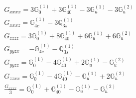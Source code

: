 \documentclass[fleqn,8pt,landscape]{jsarticle}
\begin{document}
\begin{align*}
& G_{xxxx} = 3 \mathbb{G}_{0}^{(1)} + 3 \mathbb{G}_{40}^{(1)} - 3 \mathbb{G}_{u}^{(1)} - 3 \mathbb{G}_{u}^{(2)} \\
& G_{xxxz} = \mathbb{G}_{4c}^{(1)} - 3 \mathbb{Q}_{3s}^{(1)} \\
& G_{zzzz} = 3 \mathbb{G}_{0}^{(1)} + 8 \mathbb{G}_{40}^{(1)} + 6 \mathbb{G}_{u}^{(1)} + 6 \mathbb{G}_{u}^{(2)} \\
& G_{yyzx} = - \mathbb{G}_{4c}^{(1)} - \mathbb{Q}_{3s}^{(1)} \\
& G_{yyzz} = \mathbb{G}_{0}^{(1)} - 4 \mathbb{G}_{40}^{(1)} + 2 \mathbb{G}_{u}^{(1)} - \mathbb{G}_{u}^{(2)} \\
& G_{zzxx} = \mathbb{G}_{0}^{(1)} - 4 \mathbb{G}_{40}^{(1)} - \mathbb{G}_{u}^{(1)} + 2 \mathbb{G}_{u}^{(2)} \\
& \frac{G_{xxxx}}{3} = \mathbb{G}_{0}^{(1)} + \mathbb{G}_{40}^{(1)} - \mathbb{G}_{u}^{(1)} - \mathbb{G}_{u}^{(2)}
\end{align*}
\end{document}
